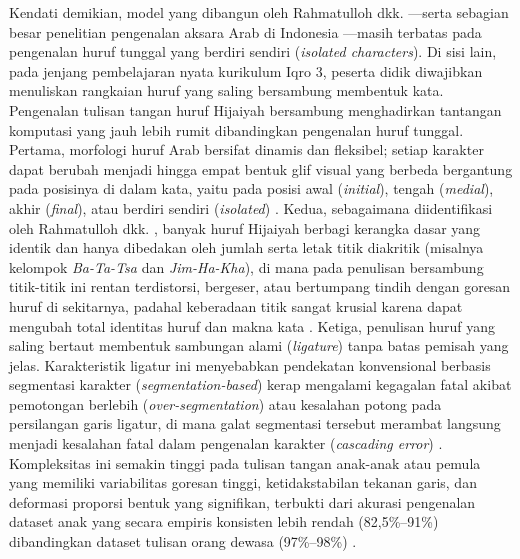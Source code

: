 \documentclass[conference]{IEEEtran}
\begin{document}
Kendati demikian, model yang dibangun oleh Rahmatulloh dkk. \cite{rahmatulloh2022}---serta sebagian besar penelitian pengenalan aksara Arab di Indonesia \cite{masruroh2023}---masih terbatas pada pengenalan huruf tunggal yang berdiri sendiri (\textit{isolated characters}). Di sisi lain, pada jenjang pembelajaran nyata kurikulum Iqro 3, peserta didik diwajibkan menuliskan rangkaian huruf yang saling bersambung membentuk kata. Pengenalan tulisan tangan huruf Hijaiyah bersambung menghadirkan tantangan komputasi yang jauh lebih rumit dibandingkan pengenalan huruf tunggal. Pertama, morfologi huruf Arab bersifat dinamis dan fleksibel; setiap karakter dapat berubah menjadi hingga empat bentuk glif visual yang berbeda bergantung pada posisinya di dalam kata, yaitu pada posisi awal (\textit{initial}), tengah (\textit{medial}), akhir (\textit{final}), atau berdiri sendiri (\textit{isolated}) \cite{altwaijry2021, durayhim2023}. Kedua, sebagaimana diidentifikasi oleh Rahmatulloh dkk. \cite{rahmatulloh2022}, banyak huruf Hijaiyah berbagi kerangka dasar yang identik dan hanya dibedakan oleh jumlah serta letak titik diakritik (misalnya kelompok \textit{Ba-Ta-Tsa} dan \textit{Jim-Ha-Kha}), di mana pada penulisan bersambung titik-titik ini rentan terdistorsi, bergeser, atau bertumpang tindih dengan goresan huruf di sekitarnya, padahal keberadaan titik sangat krusial karena dapat mengubah total identitas huruf dan makna kata \cite{albattah2022}. Ketiga, penulisan huruf yang saling bertaut membentuk sambungan alami (\textit{ligature}) tanpa batas pemisah yang jelas. Karakteristik ligatur ini menyebabkan pendekatan konvensional berbasis segmentasi karakter (\textit{segmentation-based}) kerap mengalami kegagalan fatal akibat pemotongan berlebih (\textit{over-segmentation}) atau kesalahan potong pada persilangan garis ligatur, di mana galat segmentasi tersebut merambat langsung menjadi kesalahan fatal dalam pengenalan karakter (\textit{cascading error}) \cite{peng2024, mosbah2024}. Kompleksitas ini semakin tinggi pada tulisan tangan anak-anak atau pemula yang memiliki variabilitas goresan tinggi, ketidakstabilan tekanan garis, dan deformasi proporsi bentuk yang signifikan, terbukti dari akurasi pengenalan dataset anak yang secara empiris konsisten lebih rendah (82{,}5\%--91\%) dibandingkan dataset tulisan orang dewasa (97\%--98\%) \cite{altwaijry2021, durayhim2023, alwagdani2023, masruroh2023}.
\end{document}
